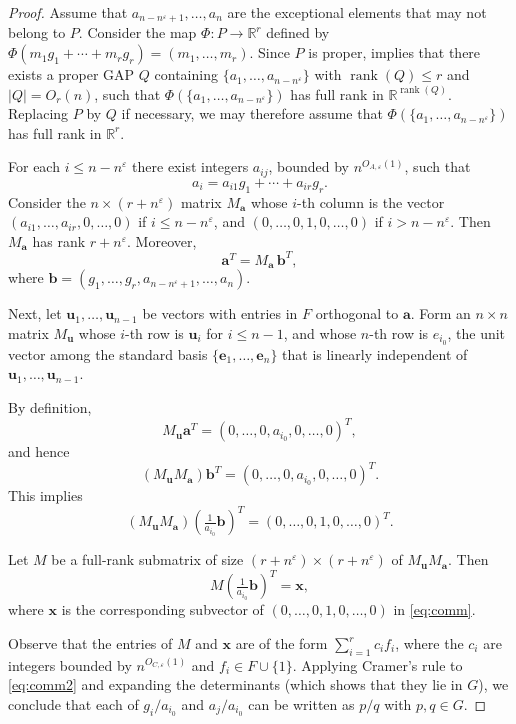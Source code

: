 \documentclass[reqno]{amsart}
\newcommand\rank{\operatorname{rank}}
\newcommand\R{{\mathbb{R}}}
\newcommand\eps{{\varepsilon}}
\newcommand\BMa{{\bm a}}
\newcommand\BMb{{\bm b}}
\newcommand\BMe{{\bm e}}
\newcommand\BMu{{\bm u}}
\newcommand\BMx{{\bm x}}
\theoremstyle{plain}
\theoremstyle{definition}
\begin{document}
\begin{proof}
Assume that
$a_{n-n^{\eps}+1},\dots,a_n$ are the exceptional elements that may not belong to $P$.
Consider the map $\Phi:P\to\R^r$ defined by
$\Phi(m_1 g_1 + \cdots + m_r g_r)=(m_1,\ldots,m_r)$.
Since $P$ is proper, \cite[Lemma~3.2]{Nguyen} implies that there exists a proper GAP $Q$
containing $\{a_1,\ldots,a_{n-n^{\eps}}\}$ with $\rank(Q)\le r$ and $|Q|=O_r (n)$,
such that $\Phi(\{a_1,\ldots,a_{n-n^{\eps}}\})$ has full rank in $\R^{\rank(Q)}$.
Replacing $P$ by $Q$ if necessary, we may therefore assume that
$\Phi(\{a_1,\ldots,a_{n-n^{\eps}}\})$ has full rank in $\R^r$.

For each $i\le n-n^{\eps}$ there exist integers $a_{ij}$,
bounded by $n^{O_{A,\eps}(1)}$, such that
\[
a_i = a_{i1}g_1 + \cdots + a_{ir}g_r.
\]
Consider the $n\times (r+n^{\eps})$ matrix $M_{\BMa}$ whose $i$-th column is the vector
$(a_{i1},\dots,a_{ir},0,\dots,0)$ if $i\le n-n^{\eps}$, and
$(0,\dots,0,1,0,\dots,0)$ if $i> n-n^{\eps}$.
Then $M_{\BMa}$ has rank $r+n^{\eps}$.
Moreover,
\[
\BMa^{T}=M_{\BMa}\,\BMb^{T},
\]
where
$\BMb=(g_1,\dots,g_r,a_{n-n^{\eps}+1},\dots,a_n)$.


Next, let $\BMu_1,\dots,\BMu_{n-1}$ be vectors with entries in $F$ orthogonal to $\BMa$.
Form an $n\times n$ matrix $M_{\BMu}$ whose $i$-th row is $\BMu_i$ for $i\le n-1$,
and whose $n$-th row is $e_{i_0}$, the unit vector among the standard basis
$\{\BMe_1,\dots,\BMe_n\}$ that is linearly independent of $\BMu_1,\dots,\BMu_{n-1}$.

By definition,
\[
M_{\BMu}\BMa^{T}=(0,\dots,0,a_{i_0},0,\dots,0)^{T},
\]
and hence
\[
(M_{\BMu}M_{\BMa})\BMb^{T}=(0,\dots,0,a_{i_0},0,\dots,0)^{T}.
\]
This implies
\begin{equation}\label{eq:comm}
(M_{\BMu}M_{\BMa})(\tfrac{1}{a_{i_0}}\BMb)^{T}
=(0,\dots,0,1,0,\dots,0)^{T}.
\end{equation}

Let $M$ be a full-rank submatrix of size $(r+n^{\eps})\times (r+n^{\eps})$
of $M_{\BMu}M_{\BMa}$. Then
\begin{equation}\label{eq:comm2}
M(\tfrac{1}{a_{i_0}}\BMb)^{T}=\BMx,
\end{equation}
where $\BMx$ is the corresponding subvector of
$(0,\dots,0,1,0,\dots,0)$ in \eqref{eq:comm}.

Observe that the entries of $M$ and $\BMx$ are of the form
$\sum_{i=1}^r c_i f_i$, where the $c_i$ are integers bounded by
$n^{O_{C,\varepsilon}(1)}$ and $f_i\in F\cup\{1\}$.
Applying Cramer's rule to \eqref{eq:comm2} and expanding the determinants (which shows that they lie in $G$),
we conclude that each of $g_i/a_{i_0}$ and $a_j/a_{i_0}$
can be written as $p/q$ with $p,q\in G$.
\end{proof}
\end{document}
